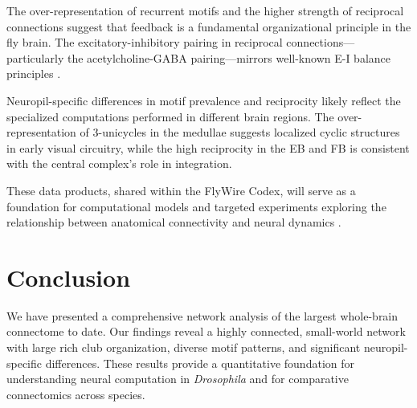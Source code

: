 \documentclass{article}
\begin{document}
The over-representation of recurrent motifs and the higher strength of reciprocal connections suggest that feedback is a fundamental organizational principle in the fly brain. The excitatory-inhibitory pairing in reciprocal connections---particularly the acetylcholine-GABA pairing---mirrors well-known E-I balance principles \citep{song2005highly, ko2011functional, perin2011synaptic}.

Neuropil-specific differences in motif prevalence and reciprocity likely reflect the specialized computations performed in different brain regions. The over-representation of 3-unicycles in the medullae suggests localized cyclic structures in early visual circuitry, while the high reciprocity in the EB and FB is consistent with the central complex's role in integration.

These data products, shared within the FlyWire Codex, will serve as a foundation for computational models and targeted experiments exploring the relationship between anatomical connectivity and neural dynamics \citep{luo2015feedback}.

\section{Conclusion}

We have presented a comprehensive network analysis of the largest whole-brain connectome to date. Our findings reveal a highly connected, small-world network with large rich club organization, diverse motif patterns, and significant neuropil-specific differences. These results provide a quantitative foundation for understanding neural computation in \textit{Drosophila} and for comparative connectomics across species.



\end{document}
